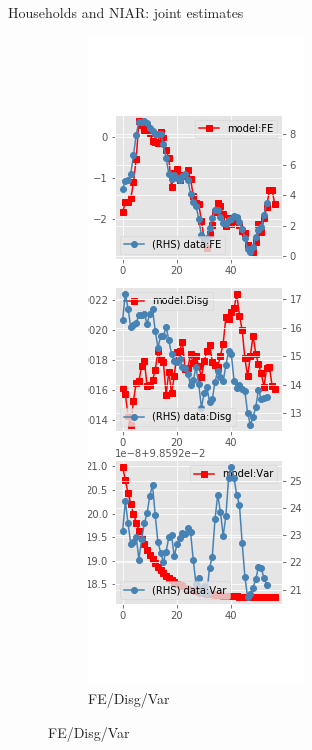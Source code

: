 \documentclass{beamer}
\begin{document}
\begin{frame}{Households and NIAR: joint estimates}
\begin{figure}[ht]
\begin{subfigure}[b]{0.2\textwidth}
		\end{subfigure}
		\hfill
		\begin{subfigure}[b]{0.2\textwidth}
			\caption{FE/Disg/Var}
			\includegraphics[width=\textwidth, height = 0.8\textheight]{figuresDraft/sce_ni_est_joint_diag2.png}
		\end{subfigure}
	\end{figure}
\end{frame}
\end{document}

